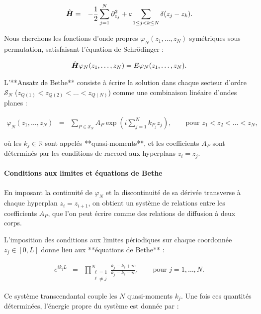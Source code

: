 {{\begin{eqnarray}
	\hat{\bm{H}} & = & -\frac{1}{2} \sum_{j=1}^N \partial_{z_j}^2 + c \sum_{1 \leq j < k \leq N} \delta(z_j - z_k).
\end{eqnarray}

Nous cherchons les fonctions d’onde propres \(\varphi_N(z_1, \dots, z_N)\) symétriques sous permutation, satisfaisant l’équation de Schrödinger :

\begin{eqnarray}
	\hat{\bm{H}} \varphi_N(z_1, \dots, z_N) = E \varphi_N(z_1, \dots, z_N).
\end{eqnarray}

L’**Ansatz de Bethe** consiste à écrire la solution dans chaque secteur d’ordre \(\mathcal{S}_N\) (\(z_{Q(1)} < z_{Q(2)} < \dots < z_{Q(N)}\)) comme une combinaison linéaire d’ondes planes :

\begin{eqnarray}
	\varphi_N(z_1, \dots, z_N) & = & \sum_{P \in \mathcal{S}_N} A_P \exp\left(i \sum_{j=1}^N k_{P_j} z_j \right), \qquad \text{pour } z_1 < z_2 < \dots < z_N,
\end{eqnarray}

où les \(k_j \in \mathbb{R}\) sont appelés **quasi-moments**, et les coefficients \(A_P\) sont déterminés par les conditions de raccord aux hyperplans \(z_i = z_j\).

\paragraph{Conditions aux limites et équations de Bethe}

En imposant la continuité de \(\varphi_N\) et la discontinuité de sa dérivée transverse à chaque hyperplan \(z_i = z_{i+1}\), on obtient un système de relations entre les coefficients \(A_P\), que l’on peut écrire comme des relations de diffusion à deux corps.

L’imposition des conditions aux limites périodiques sur chaque coordonnée \(z_j \in [0, L]\) donne lieu aux **équations de Bethe** :

\begin{eqnarray}
	e^{i k_j L} & = & \prod_{\substack{\ell = 1 \\ \ell \neq j}}^N \frac{k_j - k_\ell + i c}{k_j - k_\ell - i c}, \qquad \text{pour } j = 1, \dots, N. \label{eq:bethe}
\end{eqnarray}

Ce système transcendantal couple les \(N\) quasi-moments \(k_j\). Une fois ces quantités déterminées, l’énergie propre du système est donnée par :

}}
